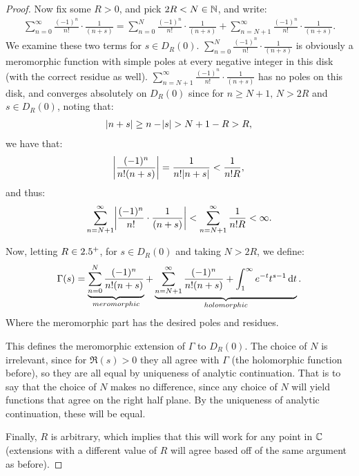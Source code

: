 \begin{proof}
Now fix some $R>0$, and pick $2R < N \in \mathbb{N}$, and write:
\begin{align*}
    \sum_{n=0}^\infty \frac{(-1)^n}{n!} \cdot \frac{1}{(n+s)} = \sum_{n=0}^N \frac{(-1)^n}{n!} \cdot \frac{1}{(n+s)} + \sum_{n=N+1}^\infty \frac{(-1)^n}{n!} \cdot \frac{1}{(n+s)}.
\end{align*}
We examine these two terms for $s \in D_R(0)$. $\sum_{n=0}^N \frac{(-1)^n}{n!} \cdot \frac{1}{(n+s)}$ is obviously a meromorphic function with simple poles at every negative integer in this disk (with the correct residue as well). $\sum_{n=N+1}^\infty \frac{(-1)^n}{n!} \cdot \frac{1}{(n+s)}$ has no poles on this disk, and converges absolutely on $D_R(0)$ since for $n\geq N+1, \, N > 2R$ and $s \in D_R(0)$, noting that:
\begin{align*}
    \abs{n+s} \geq n - \abs{s} > N+1 -R > R,
\end{align*}
we have that:
\begin{align*}
    \abs{\frac{(-1)^n}{n!(n+s)}} = \frac{1}{n!\abs{n+s}} < \frac{1}{n!R},
\end{align*}
and thus:
\begin{align*}
    \sum_{n=N+1}^\infty \abs{\frac{(-1)^n}{n!} \cdot \frac{1}{(n+s)}} < \sum_{n=N+1}^\infty \frac{1}{n! R} < \infty.
\end{align*}


Now, letting $R \in 2.5^+$, for $s \in D_R(0)$ and taking $N> 2R$, we define:
\begin{align*}
    \Gamma(s) = \underbrace{\sum_{n=0}^N \frac{(-1)^n}{n!(n+s)}}_{meromorphic} + \underbrace{\sum_{n=N+1}^\infty \frac{(-1)^n}{n!(n+s)} + \int_1^\infty e^{-t} t^{s-1} \dif t}_{holomorphic}.
\end{align*}
Where the meromorphic part has the desired poles and residues.

This defines the meromorphic extension of $\Gamma$ to $D_R(0)$. The choice of $N$ is irrelevant, since for $\Re(s) > 0 $ they all agree with $\Gamma$ (the holomorphic function before), so they are all equal by uniqueness of analytic continuation. That is to say that the choice of $N$ makes no difference, since any choice of $N$ will yield functions that agree on the right half plane. By the uniqueness of analytic continuation, these will be equal.

Finally, $R$ is arbitrary, which implies that this will work for any point in $\mathbb{C}$ (extensions with a different value of $R$ will agree based off of the same argument as before).

\end{proof}

